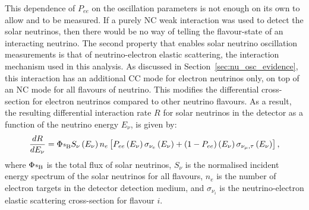 This dependence of $P_{ee}$ on the oscillation parameters is not enough on its own to allow \dmsq{} and \tonetwo{} to be measured. If a purely NC weak interaction was used to detect the solar neutrinos, then there would be no way of telling the flavour-state of an interacting neutrino. The second property that enables solar neutrino oscillation measurements is that of neutrino-electron elastic scattering, the interaction mechanism used in this analysis. As discussed in Section~\ref{sec:nu_osc_evidence}, this interaction has an additional CC mode for electron neutrinos only, on top of an NC mode for all flavours of neutrino. This modifies the differential cross-section for electron neutrinos compared to other neutrino flavours. As a result, the resulting differential interaction rate $R$ for solar neutrinos in the detector as a function of the neutrino energy $E_{\nu}$, is given by:
\begin{equation}\label{eq:solar_rate}
    \frac{dR}{dE_{\nu}} = 
        \Phi_{\beight{}}S_{\nu}\left(E_{\nu}\right)n_{e}
            \left[
                P_{ee}\left(E_{\nu}\right)\sigma_{\nu_e}\left(E_{\nu}\right) +
                \left(1-P_{ee}\right)\left(E_{\nu}\right)\sigma_{\nu_\mu,\tau}\left(E_{\nu}\right)
            \right],
\end{equation}
where $\Phi_{\beight{}}$ is the total flux of \beight{} solar neutrinos, $S_{\nu}$ is the normalised incident energy spectrum of the solar neutrinos for all flavours, $n_{e}$ is the number of electron targets in the detector detection medium, and $\sigma_{\nu_{i}}$ is the neutrino-electron elastic scattering cross-section for flavour $i$.

